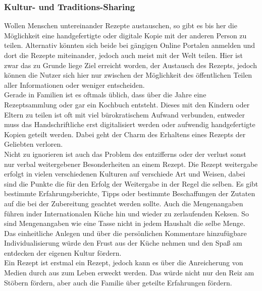 \documentclass[10pt]{article}
\begin{document}
            \subsubsection{Kultur- und Traditions-Sharing}\label{sec:cultureandtradition}
            Wollen Menschen untereinander Rezepte austauschen, so gibt es bis her die Möglichkeit eine handgefertigte oder digitale Kopie mit der anderen Person zu teilen. Alternativ könnten sich beide bei gängigen Online Portalen anmelden und dort die Rezepte miteinander, jedoch auch meist mit der Welt teilen. Hier ist zwar das zu Grunde liege Ziel erreicht worden, der Austausch des Rezepts, jedoch können die Nutzer sich hier nur zwischen der Möglichkeit des öffentlichen Teilen aller Informationen oder weniger entscheiden.\cite{gehringirights2021,gelbeseitenrezepte2021} \\
            Gerade in Familien ist es oftmals üblich, dass über die Jahre eine Rezeptsammlung oder gar ein Kochbuch entsteht. Dieses mit den Kindern oder Eltern zu teilen ist oft mit viel bürokratischem Aufwand verbunden, entweder muss das Handschriftliche erst digitalisiert werden oder aufwendig handgefertigte Kopien geteilt werden. Dabei geht der Charm des Erhaltens eines Rezepts der Geliebten verloren.\cite{wohncorerezepte2021} \\
            Nicht zu ignorieren ist auch das Problem des entzifferns oder der verlust sonst nur verbal weitergebener Besonderheiten an einem Rezept. Die Rezept weitergabe erfolgt in vielen verschiedenen Kulturen auf verschiede Art und Weisen, dabei sind die Punkte die für den Erfolg der Weitergabe in der Regel die selben. Es gibt bestimmte Erfahrungsberichte, Tipps oder bestimmte Beschaffungen der Zutaten auf die bei der Zubereitung geachtet werden sollte. Auch die Mengenangaben führen inder Internationalen Küche hin und wieder zu zerlaufenden Keksen. So sind Mengenangaben wie eine Tasse nicht in jedem Haushalt die selbe Menge.\cite{umrechnenbeimbacken2021} \\
            Das einheitliche Anlegen und über die persönlichen Kommentare hinzufügbare Individualisierung würde den Frust aus der Küche nehmen und den Spaß am entdecken der eigenen Kultur fördern. \\
            Ein Rezept ist erstmal ein Rezept, jedoch kann es über die Anreicherung von Medien durch aus zum Leben erweckt werden. Das würde nicht nur den Reiz am Stöbern fördern, aber auch die Familie über geteilte Erfahrungen fördern.\cite{glidzifug2021}
\end{document}
